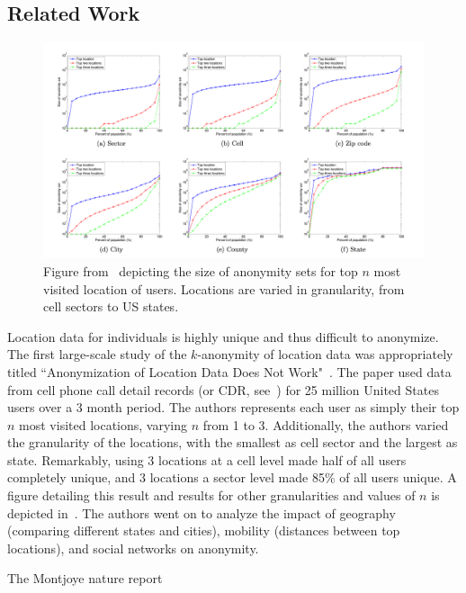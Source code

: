



\subsection{Related Work}
\begin{figure}[t]
  \centering
  \includegraphics[width=\linewidth]{fig/zang_bolot.png}
  \caption{Figure from~\cite{Zang:2011hk} depicting the size of anonymity sets for top $n$ most visited location of users.
           Locations are varied in granularity, from cell sectors to US states.}
  \label{fig:zang_bolot}
\end{figure}

Location data for individuals is highly unique and thus difficult to anonymize.
The first large-scale study of the $k$-anonymity of location data was appropriately titled ``Anonymization of Location Data Does Not Work"~\cite{Zang:2011hk}.
The paper used data from cell phone call detail records (or CDR, see~) for 25 million United States users over a 3 month period.
The authors represents each user as simply their top $n$ most visited locations, varying $n$ from 1 to 3.
Additionally, the authors varied the granularity of the locations, with the smallest as cell sector and the largest as state.
Remarkably, using 3 locations at a cell level made half of all users completely unique, and 3 locations a sector level made 85\% of all users unique.
A figure detailing this result and results for other granularities and values of $n$ is depicted in~.
The authors went on to analyze the impact of geography (comparing different states and cities), mobility (distances between top locations), and social networks on anonymity.


The Montjoye nature report


